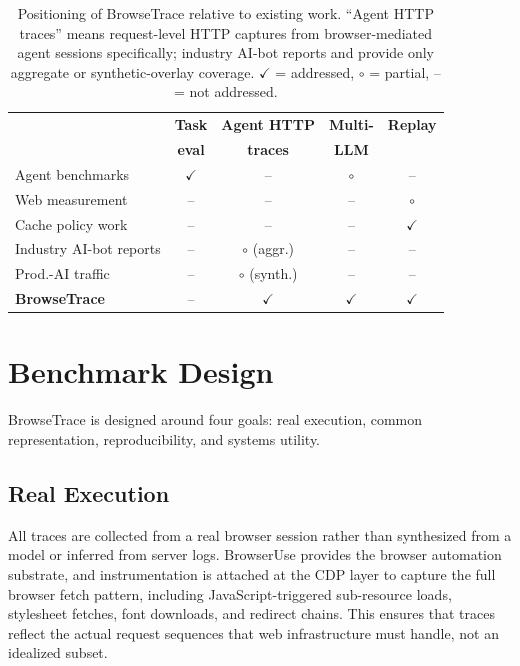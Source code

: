 \documentclass[10pt,sigconf,letterpaper,anonymous,nonacm]{acmart}
\newcommand{\sysname}{Browse\-Trace\xspace}
\begin{document}
\begin{table}[t]
\centering
\small
\caption{Positioning of \sysname relative to existing work.
  ``Agent HTTP traces'' means request-level HTTP captures from
  browser-mediated agent sessions specifically; industry AI-bot
  reports and \cite{zhang2025} provide only aggregate or synthetic-overlay
  coverage.  $\checkmark$ = addressed, $\circ$ = partial, -- = not addressed.}
\label{tab:positioning}
\setlength{\tabcolsep}{3pt}
\begin{tabular}{@{}lcccc@{}}
\toprule
& \textbf{Task} & \textbf{Agent HTTP} & \textbf{Multi-} & \textbf{Replay} \\
& \textbf{eval} & \textbf{traces}     & \textbf{LLM}    & \\
\midrule
Agent benchmarks               & $\checkmark$ & --               & $\circ$ & --           \\
Web measurement                & --           & --               & --      & $\circ$      \\
Cache policy work              & --           & --               & --      & $\checkmark$ \\
Industry AI-bot reports        & --           & $\circ$ (aggr.)  & --      & --           \\
Prod.-AI traffic~\cite{zhang2025} & --        & $\circ$ (synth.) & --      & --           \\
\textbf{\sysname}              & --           & $\checkmark$     & $\checkmark$ & $\checkmark$ \\
\bottomrule
\end{tabular}
\end{table}

\section{Benchmark Design}
\label{sec:design}

\sysname is designed around four goals: real execution, common
representation, reproducibility, and systems utility.

\subsection{Real Execution}

All traces are collected from a real browser session rather than
synthesized from a model or inferred from server logs.  BrowserUse
provides the browser automation substrate, and instrumentation is
attached at the CDP layer to capture the full browser fetch pattern,
including JavaScript-triggered sub-resource loads, stylesheet fetches,
font downloads, and redirect chains.  This ensures that traces reflect
the actual request sequences that web infrastructure must handle, not an
idealized subset.
\end{document}
